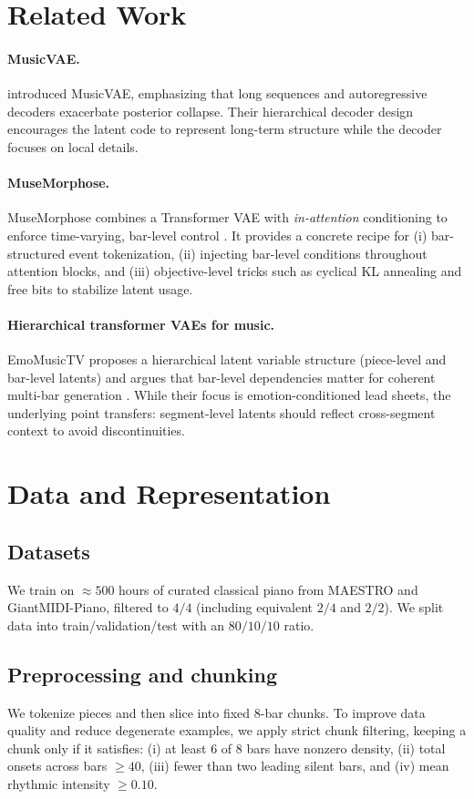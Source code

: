 \documentclass[10pt]{article}
\begin{document}
\section{Related Work}
\paragraph{MusicVAE.}
\citet{roberts2018musicvae} introduced MusicVAE, emphasizing that long sequences and autoregressive decoders exacerbate posterior collapse. Their hierarchical decoder design encourages the latent code to represent long-term structure while the decoder focuses on local details.

\paragraph{MuseMorphose.}
MuseMorphose combines a Transformer VAE with \emph{in-attention} conditioning to enforce time-varying, bar-level control \citep{wu2021musemorphose}. It provides a concrete recipe for (i) bar-structured event tokenization, (ii) injecting bar-level conditions throughout attention blocks, and (iii) objective-level tricks such as cyclical KL annealing and free bits to stabilize latent usage.

\paragraph{Hierarchical transformer VAEs for music.}
EmoMusicTV proposes a hierarchical latent variable structure (piece-level and bar-level latents) and argues that bar-level dependencies matter for coherent multi-bar generation \citep{ji2024emomusictv}. While their focus is emotion-conditioned lead sheets, the underlying point transfers: segment-level latents should reflect cross-segment context to avoid discontinuities.

\section{Data and Representation}
\subsection{Datasets}
We train on $\approx 500$ hours of curated classical piano from MAESTRO and GiantMIDI-Piano, filtered to $4/4$ (including equivalent $2/4$ and $2/2$). We split data into train/validation/test with an $80/10/10$ ratio.

\subsection{Preprocessing and chunking}
We tokenize pieces and then slice into fixed 8-bar chunks. To improve data quality and reduce degenerate examples, we apply strict chunk filtering, keeping a chunk only if it satisfies: (i) at least 6 of 8 bars have nonzero density, (ii) total onsets across bars $\ge 40$, (iii) fewer than two leading silent bars, and (iv) mean rhythmic intensity $\ge 0.10$.
\end{document}

